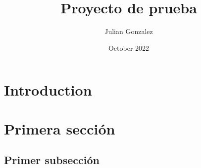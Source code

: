 \documentclass{article}
\title{Proyecto de prueba}
\author{Julian Gonzalez}
\date{October 2022}
\begin{document}
\maketitle

\section{Introduction}

\section{Primera sección}
\subsection{Primer subsección}
\end{document}
